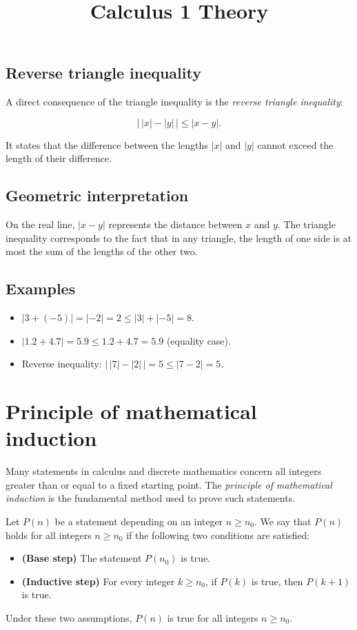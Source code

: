 \documentclass[11pt,a4paper]{article} \usepackage[T1]{fontenc}
\theoremstyle{plain} \newtheorem{theorem}{Theorem} \title{Calculus 1 Theory}
\begin{document}
\subsection*{Reverse triangle inequality}

A direct consequence of the triangle inequality is the \emph{reverse triangle
inequality}:

\[
\bigl|\,|x| - |y|\,\bigr| \le |x-y|.
\]

It states that the difference between the lengths $|x|$ and $|y|$ cannot exceed
the length of their difference.

\subsection*{Geometric interpretation}

On the real line, $|x-y|$ represents the distance between $x$ and $y$. The
triangle inequality corresponds to the fact that in any triangle, the length of
one side is at most the sum of the lengths of the other two.

\subsection*{Examples}

\begin{itemize}
\item $|3 + (-5)| = | -2 | = 2 \le |3| + | -5 | = 8$.
\item $|1.2 + 4.7| = 5.9 \le 1.2 + 4.7 = 5.9$ (equality case).
\item Reverse inequality: $\bigl|\,|7| - |2|\,\bigr| = 5 \le |7-2| = 5$.
\end{itemize}

\section{Principle of mathematical induction}

Many statements in calculus and discrete mathematics concern all integers
greater than or equal to a fixed starting point. The \emph{principle of
mathematical induction} is the fundamental method used to prove such
statements.

\begin{definition}
 Let $P(n)$ be a statement depending on an integer
$n\ge n_0$. We say that $P(n)$ holds for all integers $n\ge n_0$ if the
following two conditions are satisfied:

\begin{itemize}
\item \textbf{(Base step)} The statement $P(n_0)$ is true.
\item \textbf{(Inductive step)} For every integer $k\ge n_0$, if $P(k)$ is
true, then $P(k+1)$ is true.
\end{itemize}

Under these two assumptions, $P(n)$ is true for all integers $n\ge n_0$.
\end{definition}
\end{document}
